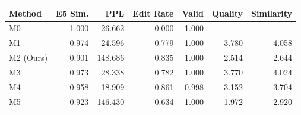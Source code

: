 \begin{tabular}{lrrrrrr}
\toprule
Method & E5 Sim. & PPL & Edit Rate & Valid & Quality & Similarity \\
\midrule
M0 & 1.000 & 26.662 & 0.000 & 1.000 & --- & --- \\
M1 & 0.974 & 24.596 & 0.779 & 1.000 & 3.780 & 4.058 \\
M2 (Ours) & 0.901 & 148.686 & 0.835 & 1.000 & 2.514 & 2.644 \\
M3 & 0.973 & 28.338 & 0.782 & 1.000 & 3.770 & 4.024 \\
M4 & 0.958 & 18.909 & 0.861 & 0.998 & 3.152 & 3.704 \\
M5 & 0.923 & 146.430 & 0.634 & 1.000 & 1.972 & 2.920 \\
\bottomrule
\end{tabular}

